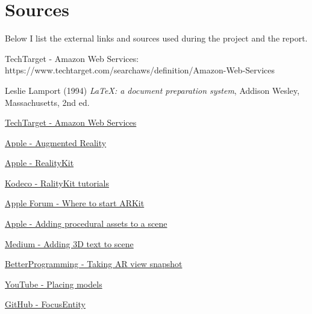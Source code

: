 \documentclass[11pt,a4paper,oneside]{report}
\begin{document}
\chapter{Sources}

Below I list the external links and sources used during the project and the report.

% 


\begin{thebibliography}{9}
  TechTarget - Amazon Web Services: https://www.techtarget.com/searchaws/definition/Amazon-Web-Services

  Leslie Lamport (1994) \emph{\LaTeX: a document preparation system}, Addison
  Wesley, Massachusetts, 2nd ed.
\end{thebibliography}

\hyperlink{https://www.techtarget.com/searchaws/definition/Amazon-Web-Services}{TechTarget - Amazon Web Services}

\hyperlink{https://developer.apple.com/augmented-reality/}{Apple - Augmented Reality}

\hyperlink{https://developer.apple.com/documentation/realitykit/}{Apple - RealityKit}

\hyperlink{https://www.kodeco.com/books/apple-augmented-reality-by-tutorials/v1.0/chapters/iii-introduction}{Kodeco - RalityKit tutorials}

\hyperlink{https://developer.apple.com/forums/thread/658300}{Apple Forum - Where to start ARKit}

\hyperlink{https://developer.apple.com/documentation/realitykit/adding-procedural-assets-to-a-scene}{Apple - Adding procedural assets to a scene}

\hyperlink{https://coledennis.medium.com/tutorial-generating-3d-text-with-realitykit-in-a-swiftui-app-fa2a50403012}{Medium - Adding 3D text to scene}

\hyperlink{https://betterprogramming.pub/take-an-arview-snapshot-in-realitykit-93b620cf99b3}{BetterProgramming - Taking AR view snapshot}

\hyperlink{https://www.youtube.com/watch?v=9R_G0EI-UoI}{YouTube - Placing models}

\hyperlink{https://github.com/maxxfrazer/FocusEntity}{GitHub - FocusEntity}
\end{document}
